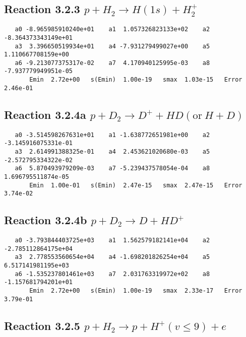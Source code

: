\documentclass[12pt]{article}
\begin{document}
\newpage
\subsection{
Reaction 3.2.3 $   p + H_2 \rightarrow H(1s) + H_2^+$}


\begin{small}\begin{verbatim}
   a0 -8.965985910240e+01    a1  1.057326823133e+02    a2 -8.364373343149e+01
   a3  3.396650519934e+01    a4 -7.931279499027e+00    a5  1.110667708159e+00
   a6 -9.213077375317e-02    a7  4.170940125995e-03    a8 -7.937779949951e-05
       Emin  2.72e+00   s(Emin)  1.00e-19   smax  1.03e-15   Error  2.46e-01
\end{verbatim}\end{small}

\newpage
\subsection{
Reaction 3.2.4a $   p + D_2 \rightarrow D^+ + HD (\mbox{or}~ H + D)$}


\begin{small}\begin{verbatim}
   a0 -3.514598267631e+01    a1 -1.638772651981e+00    a2 -3.145916075331e-01
   a3  2.614991388325e-01    a4  2.453621020680e-03    a5 -2.572795334322e-02
   a6  5.870493979209e-03    a7 -5.239437578054e-04    a8  1.696795511874e-05
       Emin  1.00e-01   s(Emin)  2.47e-15   smax  2.47e-15   Error  3.74e-02
\end{verbatim}\end{small}

\newpage
\subsection{
Reaction 3.2.4b $   p + D_2 \rightarrow D + HD^+$}


\begin{small}\begin{verbatim}
   a0 -3.793844403725e+03    a1  1.562579182141e+04    a2 -2.785112864175e+04
   a3  2.778553560654e+04    a4 -1.698201826254e+04    a5  6.517141981195e+03
   a6 -1.535237801461e+03    a7  2.031763319972e+02    a8 -1.157681794201e+01
       Emin  2.72e+00   s(Emin)  1.00e-19   smax  2.33e-17   Error  3.79e-01
\end{verbatim}\end{small}

\newpage
\subsection{
Reaction 3.2.5 $   p + H_2 \rightarrow p + H^+(v \leq 9) + e$}
\end{document}
